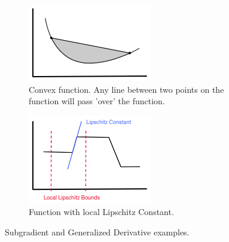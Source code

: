 \begin{figure}
  \centering
  \begin{subfigure}[b]{0.48\columnwidth}
    \includegraphics[width=\linewidth]{figs/convex_example}
    \caption{\label{fig:convex_ex} Convex function. Any line between two points on the function will pass 'over' the function.}
  \end{subfigure}
  \hspace{0.15cm}
  \begin{subfigure}[b]{0.48\columnwidth}
    \includegraphics[width=\linewidth]{figs/lipschitz_ex}
  \caption{\label{fig:lipschitz_ex} Function with local Lipschitz Constant.}
  \end{subfigure}
  \vspace{-10pt}
  \caption{\label{fig:convex_lip_ex} Subgradient and Generalized Derivative examples.}
  \vspace{-15pt}
\end{figure}

